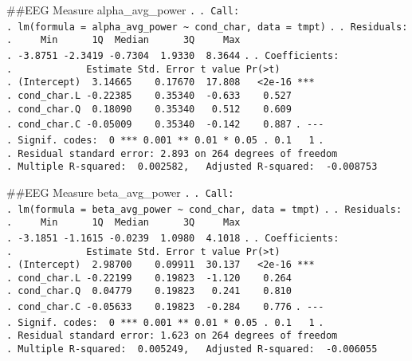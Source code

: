 \documentclass[
]{article}
\begin{document}
\#\#EEG Measure alpha\_avg\_power \texttt{.} \texttt{.\ Call:}
\texttt{.\ lm(formula\ =\ alpha\_avg\_power\ \textasciitilde{}\ cond\_char,\ data\ =\ tmpt)}
\texttt{.} \texttt{.\ Residuals:}
\texttt{.\ \ \ \ \ Min\ \ \ \ \ \ 1Q\ \ Median\ \ \ \ \ \ 3Q\ \ \ \ \ Max}
\texttt{.\ -3.8751\ -2.3419\ -0.7304\ \ 1.9330\ \ 8.3644} \texttt{.}
\texttt{.\ Coefficients:}
\texttt{.\ \ \ \ \ \ \ \ \ \ \ \ \ Estimate\ Std.\ Error\ t\ value\ Pr(\textgreater{}\textbar{}t\textbar{})}
\texttt{.\ (Intercept)\ \ 3.14665\ \ \ \ 0.17670\ \ 17.808\ \ \ \textless{}2e-16\ ***}
\texttt{.\ cond\_char.L\ -0.22385\ \ \ \ 0.35340\ \ -0.633\ \ \ \ 0.527}
\texttt{.\ cond\_char.Q\ \ 0.18090\ \ \ \ 0.35340\ \ \ 0.512\ \ \ \ 0.609}
\texttt{.\ cond\_char.C\ -0.05009\ \ \ \ 0.35340\ \ -0.142\ \ \ \ 0.887}
\texttt{.\ -\/-\/-}
\texttt{.\ Signif.\ codes:\ \ 0\ \textquotesingle{}***\textquotesingle{}\ 0.001\ \textquotesingle{}**\textquotesingle{}\ 0.01\ \textquotesingle{}*\textquotesingle{}\ 0.05\ \textquotesingle{}.\textquotesingle{}\ 0.1\ \textquotesingle{}\ \textquotesingle{}\ 1}
\texttt{.}
\texttt{.\ Residual\ standard\ error:\ 2.893\ on\ 264\ degrees\ of\ freedom}
\texttt{.\ Multiple\ R-squared:\ \ 0.002582,\ \ \ Adjusted\ R-squared:\ \ -0.008753}

\#\#EEG Measure beta\_avg\_power \texttt{.} \texttt{.\ Call:}
\texttt{.\ lm(formula\ =\ beta\_avg\_power\ \textasciitilde{}\ cond\_char,\ data\ =\ tmpt)}
\texttt{.} \texttt{.\ Residuals:}
\texttt{.\ \ \ \ \ Min\ \ \ \ \ \ 1Q\ \ Median\ \ \ \ \ \ 3Q\ \ \ \ \ Max}
\texttt{.\ -3.1851\ -1.1615\ -0.0239\ \ 1.0980\ \ 4.1018} \texttt{.}
\texttt{.\ Coefficients:}
\texttt{.\ \ \ \ \ \ \ \ \ \ \ \ \ Estimate\ Std.\ Error\ t\ value\ Pr(\textgreater{}\textbar{}t\textbar{})}
\texttt{.\ (Intercept)\ \ 2.98700\ \ \ \ 0.09911\ \ 30.137\ \ \ \textless{}2e-16\ ***}
\texttt{.\ cond\_char.L\ -0.22199\ \ \ \ 0.19823\ \ -1.120\ \ \ \ 0.264}
\texttt{.\ cond\_char.Q\ \ 0.04779\ \ \ \ 0.19823\ \ \ 0.241\ \ \ \ 0.810}
\texttt{.\ cond\_char.C\ -0.05633\ \ \ \ 0.19823\ \ -0.284\ \ \ \ 0.776}
\texttt{.\ -\/-\/-}
\texttt{.\ Signif.\ codes:\ \ 0\ \textquotesingle{}***\textquotesingle{}\ 0.001\ \textquotesingle{}**\textquotesingle{}\ 0.01\ \textquotesingle{}*\textquotesingle{}\ 0.05\ \textquotesingle{}.\textquotesingle{}\ 0.1\ \textquotesingle{}\ \textquotesingle{}\ 1}
\texttt{.}
\texttt{.\ Residual\ standard\ error:\ 1.623\ on\ 264\ degrees\ of\ freedom}
\texttt{.\ Multiple\ R-squared:\ \ 0.005249,\ \ \ Adjusted\ R-squared:\ \ -0.006055}
\end{document}
